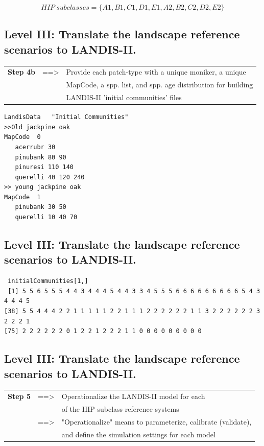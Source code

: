 \documentclass[
paper=128mm:96mm, %
fontsize=11pt, %
pagesize, %
parskip=half-, %
]{scrartcl} %
\theoremstyle{mythmstyle} %
\begin{document}
\[ HIP \ subclasses = \{ A1, B1, C1, D1, E1, A2, B2, C2, D2, E2\} \]
\clearpage
\subsection{Level III: Translate the landscape reference scenarios to LANDIS-II.}
\begin{tabular}{lll}
	\textbf{Step 4b} & ==> & Provide each patch-type with a unique moniker, a unique \\
	& & MapCode, a spp. list, and spp. age distribution for building \\
	& & LANDIS-II 'initial communities' files
\end{tabular}
\tiny 
\begin{verbatim}
LandisData   "Initial Communities"
>>Old jackpine oak 
MapCode  0
   acerrubr 30
   pinubank 80 90
   pinuresi 110 140
   querelli 40 120 240
>> young jackpine oak
MapCode  1
   pinubank 30 50
   querelli 10 40 70
\end{verbatim}

\clearpage
\subsection{Level III: Translate the landscape reference scenarios to LANDIS-II.}
    \tiny 
 \begin{verbatim}
 initialCommunities[1,]
 [1] 5 5 6 5 5 5 4 4 3 4 4 4 5 4 4 3 3 4 5 5 5 6 6 6 6 6 6 6 6 6 5 4 3 4 4 4 5
[38] 5 5 4 4 4 2 2 1 1 1 1 1 2 2 1 1 1 2 2 2 2 2 2 1 1 3 2 2 2 2 2 2 3 2 2 2 1
[75] 2 2 2 2 2 2 0 1 2 2 1 2 2 2 1 1 0 0 0 0 0 0 0 0 0
 \end{verbatim}   

\clearpage
\subsection{Level III: Translate the landscape reference scenarios to LANDIS-II.}
\footnotesize 
\begin{tabular}{lll}
	\textbf{Step 5} & ==> & Operationalize the LANDIS-II model for each\\
	& & of the HIP subclass reference systems\\
	& ==> & "Operationalize" means to parameterize, calibrate (validate), \\
	& & and define the simulation settings for each model
\end{tabular}
\end{document}
